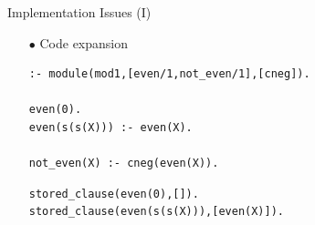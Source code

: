 \documentclass[pdf,slideColor,contemporain]{prosper}
\begin{document}

\begin{slide}{Implementation Issues (I)}
     \begin{itemize}
        \item[$\bullet$] {\blue Code expansion}
\begin{small}
\begin{verbatim}
:- module(mod1,[even/1,not_even/1],[cneg]).

even(0).
even(s(s(X))) :- even(X).

not_even(X) :- cneg(even(X)).
\end{verbatim}
{\blue
\begin{verbatim}
stored_clause(even(0),[]).
stored_clause(even(s(s(X))),[even(X)]).

\end{verbatim}}
\end{small}
     \end{itemize}
\end{slide}
\end{document}
